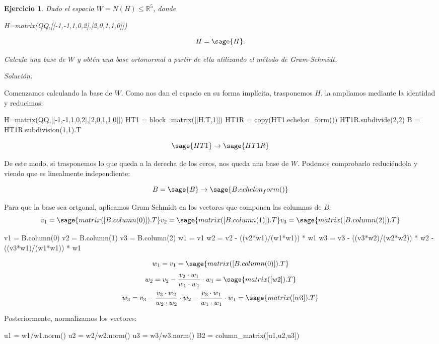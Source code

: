 \documentclass{amsart}
\newtheorem{ejer}{Ejercicio}
\def\r{\mathbb{R}}
\begin{document}

\begin{ejer}
Dado el espacio $W = N(H) \leq \r^5$, donde

\begin{sageblock}
H=matrix(QQ,[[-1,-1,1,0,2],[2,0,1,1,0]])
\end{sageblock}

\[ H = \sage{H}.\] 

Calcula una base de $W$ y obtén una base ortonormal a partir de ella utilizando el método de Gram-Schmidt.
\end{ejer}

{\it Solución:}

Comenzamos calculando la base de $W$. Como nos dan el espacio en su forma implícita, trasponemos $H$, la ampliamos mediante la identidad y reducimos:
\begin{sageblock}
H=matrix(QQ,[[-1,-1,1,0,2],[2,0,1,1,0]])
HT1 = block_matrix([[H.T,1]])
HT1R = copy(HT1.echelon_form())
HT1R.subdivide(2,2)
B = HT1R.subdivision(1,1).T
\end{sageblock}
$$ \sage{HT1} \to \sage{HT1R} $$

De este modo, si trasponemos lo que queda a la derecha de los ceros, nos queda una base de $W$. Podemos comprobarlo reduciéndola y viendo que es linealmente independiente:

$$ B = \sage{B} \to \sage{B.echelon_form()} $$

Para que la base sea ortgonal, aplicamos Gram-Schmidt en los vectores que componen las columnas de $B$:
$$ v_1 = \sage{matrix([B.column(0)]).T} v_2 = \sage{matrix([B.column(1)]).T} v_3 = \sage{matrix([B.column(2)]).T}$$

\begin{sageblock}
v1 = B.column(0)
v2 = B.column(1)
v3 = B.column(2)
w1 = v1
w2 = v2 - ((v2*w1)/(w1*w1)) * w1
w3 = v3 - ((v3*w2)/(w2*w2)) * w2 - ((v3*w1)/(w1*w1)) * w1
\end{sageblock}

$$ w_1 = v_1 = \sage{matrix([B.column(0)]).T}$$
$$ w_2 = v_2 - \frac{v_2\cdot w_1}{w_1\cdot w_1}\cdot w_1 = \sage{matrix([w2]).T}$$
$$ w_3 = v_3 - \frac{v_3\cdot w_2}{w_2\cdot w_2}\cdot w_2 - \frac{v_3\cdot w_1}{w_1\cdot w_1}\cdot w_1 = \sage{matrix([w3]).T}$$

Posteriormente, normalizamos los vectores:
\begin{sageblock}
u1 = w1/w1.norm()
u2 = w2/w2.norm()
u3 = w3/w3.norm()
B2 = column_matrix([u1,u2,u3])
\end{sageblock}
\end{document}
